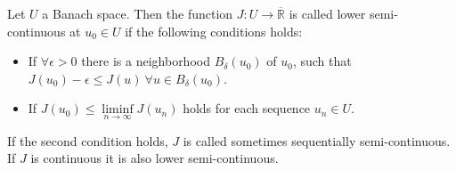 \begin{definition}
	Let $U$ a Banach space. Then the function $J:U\rightarrow \overline{\mathbb{R}}$ is called lower semi-continuous at $u_0 \in U$ if the following conditions holds:
	\begin{itemize}
		\item If $\forall \epsilon > 0$ there is a neighborhood $B_\delta (u_0)$ of $u_0$, such that $J(u_0)-\epsilon \leq J(u) \ \forall u \in B_\delta(u_0)$.
		\item If $J(u_0)\leq\underset{n\rightarrow \infty} {\liminf}J(u_n)$ holds for each sequence $u_n \in U$.
	\end{itemize}
\end{definition}

\begin{remark}
	If the second condition holds, $J$ is called sometimes sequentially semi-continuous. If $J$ is continuous it is also lower semi-continuous.
\end{remark}
